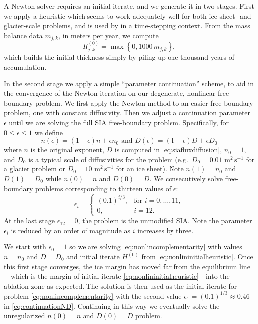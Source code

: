 \documentclass[twocolumn,letterpaper]{igs}
\newcommand\eps{\epsilon}
\begin{document}
A Newton solver requires an initial iterate, and we generate it in two stages.  First we apply a heuristic which seems to work adequately-well for both ice sheet- and glacier-scale problems, and is used by \cite{JouvetGraeser2013} in a time-stepping context.  From the mass balance data $m_{j,k}$, in meters per year, we compute
\begin{equation}
H_{j,k}^{(0)} = \max\left\{0,1000\,m_{j,k}\right\},  \label{eq:nonlininitialheuristic}
\end{equation}
which builds the initial thickness simply by piling-up one thousand years of accumulation.

In the second stage we apply a simple ``parameter continuation'' scheme, to aid in the convergence of the Newton iteration on our degenerate, nonlinear free-boundary problem.  We first apply the Newton method to an easier free-boundary problem, one with constant diffusivity.  Then we adjust a continuation parameter $\eps$ until we are solving the full SIA free-boundary problem.  Specifically, for $0 \le \eps \le 1$ we define
\begin{equation}
n(\eps) = (1\!-\eps) n + \eps n_0 \text{ and } D(\eps) = (1\!-\eps) D + \eps D_0  \label{eq:continuationND}
\end{equation}
where $n$ is the original exponent, $D$ is computed in \eqref{eq:siafluxdiffusion}, $n_0=1$, and $D_0$ is a typical scale of diffusivities for the problem (e.g.~$D_0=0.01$ $\text{m}^2\,\text{s}^{-1}$ for a glacier problem or $D_0=10$ $\text{m}^2\,\text{s}^{-1}$ for an ice sheet).  Note $n(1)=n_0$ and $D(1)=D_0$ while $n(0)=n$ and $D(0)=D$.  We consecutively solve free-boundary problems corresponding to thirteen values of $\eps$:
\begin{equation}
\eps_i = \begin{cases}
           (0.1)^{i/3}, & \text{for } i=0,\dots,11, \\
           0, & i=12.
         \end{cases}  \label{eq:continuationseq}
\end{equation}
At the last stage $\eps_{12}=0$, the problem is the unmodified SIA.  Note the parameter $\eps_i$ is reduced by an order of magnitude as $i$ increases by three.

We start with $\eps_0=1$ so we are solving \eqref{eq:nonlincomplementarity} with values $n=n_0$ and $D=D_0$ and initial iterate $H^{(0)}$ from \eqref{eq:nonlininitialheuristic}.  Once this first stage converges, the ice margin has moved far from the equilibrium line---which is the margin of initial iterate \eqref{eq:nonlininitialheuristic}---into the ablation zone as expected.  The solution is then used as the initial iterate for problem \eqref{eq:nonlincomplementarity} with the second value $\eps_1=(0.1)^{1/3}\approx 0.46$ in \eqref{eq:continuationND}.  Continuing in this way we eventually solve the unregularized $n(0)=n$ and $D(0)=D$ problem.
\end{document}
